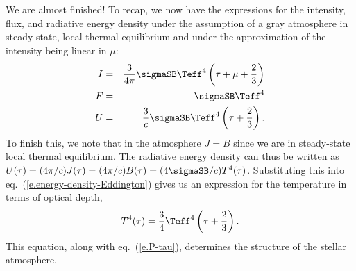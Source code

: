 We are almost finished! To recap, we now have the expressions for the intensity, flux, and radiative energy density under the assumption of a gray atmosphere in steady-state, local thermal equilibrium and under the approximation of the intensity being linear in $\mu$:
\begin{eqnarray*}
I &=& \frac{3}{4\pi}\sigmaSB\Teff^{4}\left(\tau + \mu + \frac{2}{3}\right)\\
F &=& \sigmaSB\Teff^{4}\\
U &=& \frac{3}{c}\sigmaSB\Teff^{4}\left(\tau + \frac{2}{3}\right).
\end{eqnarray*}
To finish this, we note that in the atmosphere $J = B$ since we are in steady-state local thermal equilibrium. The radiative energy density can thus be written as $U(\tau) = (4\pi/c) J(\tau) = (4\pi/c)B(\tau) = (4\sigmaSB/c )T^{4}(\tau)$. Substituting this into eq.~(\ref{e.energy-density-Eddington}) gives us an expression for the temperature in terms of optical depth,
\begin{equation}\label{e.T-tau}
T^{4}(\tau) = \frac{3}{4}\Teff^{4}\left(\tau + \frac{2}{3}\right).
\end{equation}
This equation, along with eq.~(\ref{e.P-tau}), determines the structure of the stellar atmosphere.

